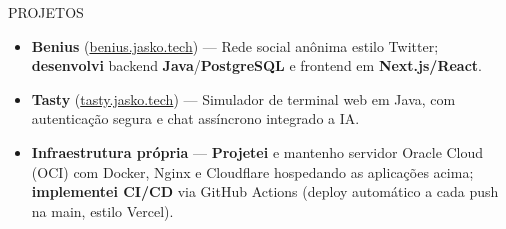 \documentclass{resume} %
\begin{document}
\begin{rSection}{PROJETOS}
\begin{itemize}
    \itemsep -5pt {}
    \item \textbf{Benius} (\href{https://benius.jasko.tech}{benius.jasko.tech}) — Rede social anônima estilo Twitter; \textbf{desenvolvi} backend \textbf{Java}/\textbf{PostgreSQL} e frontend em \textbf{Next.js/React}.
    \item \textbf{Tasty} (\href{https://tasty.jasko.tech}{tasty.jasko.tech}) — Simulador de terminal web em Java, com autenticação segura e chat assíncrono integrado a IA.
    \item \textbf{Infraestrutura própria} — \textbf{Projetei} e mantenho servidor Oracle Cloud (OCI) com Docker, Nginx e Cloudflare hospedando as aplicações acima; \textbf{implementei CI/CD} via GitHub Actions (deploy automático a cada push na main, estilo Vercel).
\end{itemize}
\end{rSection}
\end{document}
